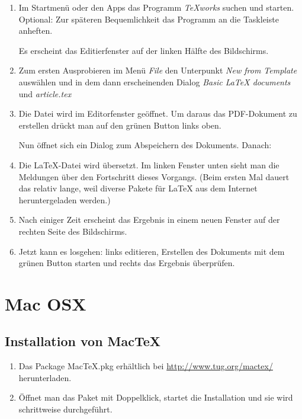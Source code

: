 \begin{enumerate}
	\item Im Startmenü oder den Apps das Programm \emph{TeXworks} suchen
		und starten. Optional: Zur späteren Bequemlichkeit das Programm an die
		Taskleiste anheften. 

		Es erscheint das Editierfenster auf der linken Hälfte des Bildschirms.

	\item Zum ersten Ausprobieren im Menü \emph{File} den Unterpunkt \emph{New 
	 	from Template} auswählen und in dem dann erscheinenden Dialog \emph{Basic 
		LaTeX documents} und \emph{article.tex}

	\item	Die Datei wird im Editorfenster geöffnet. Um daraus das PDF-Dokument
		zu erstellen drückt man auf den grünen Button links oben.

		Nun öffnet sich ein Dialog zum Abspeichern des Dokuments. Danach:

	\item	Die LaTeX-Datei wird übersetzt. Im linken Fenster unten sieht man die
		Meldungen über den Fortschritt dieses Vorgangs. (Beim ersten Mal
		dauert das relativ lange, weil diverse Pakete für LaTeX aus dem
		Internet heruntergeladen werden.)

	\item	Nach einiger Zeit erscheint das Ergebnis in einem neuen Fenster auf
		der rechten Seite des Bildschirms.

	\item	Jetzt kann es losgehen: links editieren, Erstellen des Dokuments
		mit dem grünen Button starten und rechts das Ergebnis überprüfen.
\end{enumerate}


\section{Mac OSX}

\subsection*{Installation von Mac\TeX}

\begin{enumerate}
	\item Das Package MacTeX.pkg erhältlich bei
		\url{http://www.tug.org/mactex/} herunterladen.
	\item Öffnet man das Paket mit Doppelklick, startet die Installation
		und sie wird schrittweise durchgeführt.	
\end{enumerate}

